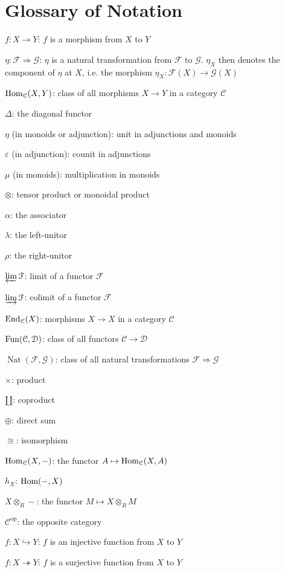 \newpage
\appendix
\section{Glossary of Notation}
\setlength{\parindent}{0em}
$f : X \to Y$: $f$ is a morphism from $X$ to $Y$

$\eta : \mathcal{F}  \Rightarrow \mathcal{G} $: $\eta $ is a natural transformation from $\mathcal{F} $ to $\mathcal{G} $. $\eta _X$ then denotes the component of $\eta $ at $X$, i.e. the morphism $\eta _X : \mathcal{F} (X) \to \mathcal{G} (X)$

$\operatorname{Hom}_{\mathcal{C} }(X, Y) $: class of all morphisms $X\to Y$ in a category $\mathcal{C} $

$\Delta $: the diagonal functor

$\eta $ (in monoids or adjunction): unit in adjunctions and monoids

$\varepsilon $ (in adjunction): counit in adjunctions

$\mu $ (in monoids): multiplication in monoids

$\otimes $: tensor product or monoidal product

$\alpha $: the associator

$\lambda $: the left-unitor

$\rho $: the right-unitor

$\varprojlim \mathcal{F} $: limit of a functor $\mathcal{F} $

$\varinjlim \mathcal{F} $: colimit of a functor $\mathcal{F} $

$\operatorname{End}_{\mathcal{C} }(X) $: morphisms $X\to X$ in a category $\mathcal{C} $

$\operatorname{Fun}(\mathcal{C} ,\mathcal{D} )$: class of all functors $\mathcal{C} \to \mathcal{D} $

$\operatorname{Nat} (\mathcal{F} ,\mathcal{G} )$: class of all natural transformations $ \mathcal{F}  \Rightarrow \mathcal{G} $

$\times $: product

$\amalg$: coproduct

$\oplus $: direct sum

$\cong $: isomorphism

$\operatorname{Hom}_{\mathcal{C} }(X, -) $: the functor $A\mapsto \operatorname{Hom}_{\mathcal{C} }(X, A) $

$h_X$: $\operatorname{Hom}(-, X) $

$X\otimes _R-$: the functor $M\mapsto X\otimes _RM$

$\mathcal{C}^{\mathrm{op} } $: the opposite category

$f : X \hookrightarrow Y$: $f$ is an injective function from $X$ to $Y$

$f : X \twoheadrightarrow Y$: $f$ is a surjective function from $X$ to $Y$
